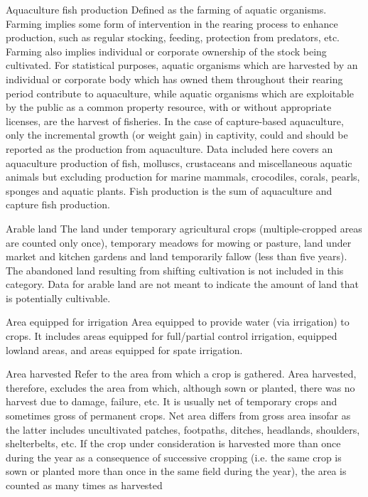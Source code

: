 \begin{MetadataCollection} {}
\begin{metadata}{Aquaculture fish production} {}
Defined as the farming of aquatic organisms. Farming implies some form of intervention in the rearing process to enhance production, such as regular stocking, feeding, protection from predators, etc. Farming also implies individual or corporate ownership of the stock being cultivated. For statistical purposes, aquatic organisms which are harvested by an individual or corporate body which has owned them throughout their rearing period contribute to aquaculture, while aquatic organisms which are exploitable by the public as a common property resource, with or without appropriate licenses, are the harvest of fisheries. In the case of capture-based aquaculture, only the incremental growth (or weight gain) in captivity, could and should be reported as the production from aquaculture. Data included here covers an aquaculture production of fish, molluscs, crustaceans and miscellaneous aquatic animals but excluding production for marine mammals, crocodiles, corals, pearls, sponges and aquatic plants. Fish production is the sum of aquaculture and capture fish production.
\end{metadata}

\begin{metadata}{Arable land} {}
The land under temporary agricultural crops (multiple-cropped areas are counted only once), temporary meadows for mowing or pasture, land under market and kitchen gardens and land temporarily fallow (less than five years). The abandoned land resulting from shifting cultivation is not included in this category. Data for arable land are not meant to indicate the amount of land that is potentially cultivable.
\end{metadata}

\begin{metadata}{Area equipped for irrigation} {}
Area equipped to provide water (via irrigation) to crops. It includes areas equipped for full/partial control irrigation, equipped lowland areas, and areas equipped for spate irrigation.
\end{metadata}

\begin{metadata}{Area harvested} {}
Refer to the area from which a crop is gathered. Area harvested, therefore, excludes the area from which, although sown or planted, there was no harvest due to damage, failure, etc. It is usually net of temporary crops and sometimes gross of permanent crops. Net area differs from gross area insofar as the latter includes uncultivated patches, footpaths, ditches, headlands, shoulders, shelterbelts, etc. If the crop under consideration is harvested more than once during the year as a consequence of successive cropping (i.e. the same crop is sown or planted more than once in the same field during the year), the area is counted as many times as harvested
\end{metadata}


\end{MetadataCollection}
